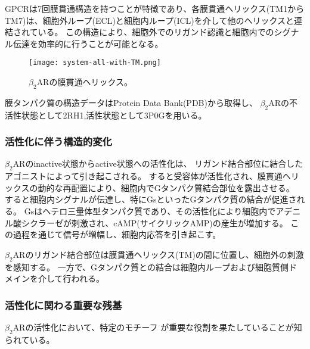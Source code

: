 GPCRは7回膜貫通構造を持つことが特徴であり、各膜貫通ヘリックス(TM1からTM7)は、細胞外ループ(ECL)と細胞内ループ(ICL)を介して他のヘリックスと連結されている。
この構造により、細胞外でのリガンド認識と細胞内でのシグナル伝達を効率的に行うことが可能となる。

\begin{figure}[htbp]
  \centering
  \texttt{[image: system-all-with-TM.png]}
  \caption{$\beta_2$ARの膜貫通ヘリックス。}
  \label{fig:all}
\end{figure}

\newpage

膜タンパク質の構造データはProtein Data Bank(PDB)から取得し、
$\beta_2$ARの不活性状態として2RH1\cite{cherezov2007},活性状態として3P0G\cite{rasmussen2011}を用いる。

\subsubsection{活性化に伴う構造的変化}
$\beta_2$ARのinactive状態からactive状態への活性化は、
リガンド結合部位に結合したアゴニストによって引き起こされる。
すると受容体が活性化され、膜貫通ヘリックスの動的な再配置により、細胞内でGタンパク質結合部位を露出させる。
すると細胞内シグナルが伝達し、特にGsといったGタンパク質の結合が促進される。
Gsはヘテロ三量体型タンパク質であり、その活性化により細胞内でアデニル酸シクラーゼが刺激され、cAMP(サイクリックAMP)の産生が増加する。
この過程\cite{philip2007}を通じて信号が増幅し、細胞内応答を引き起こす。

$\beta_2$ARのリガンド結合部位は膜貫通ヘリックス(TM)の間に位置し、細胞外の刺激を感知する。
一方で、Gタンパク質との結合は細胞内ループおよび細胞質側ドメインを介して行われる。


\subsubsection{活性化に関わる重要な残基}
$\beta_2$ARの活性化において、特定のモチーフ\cite{nygaard2009ligand}\cite{lee2013mapping}
が重要な役割を果たしていることが知られている。

